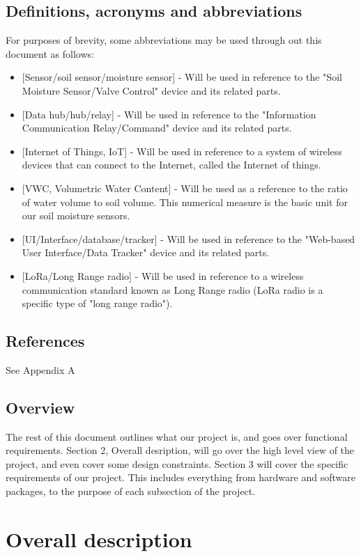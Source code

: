 \documentclass[onecolumn, draftclsnofoot,10pt, compsoc]{IEEEtran}
\begin{document}
	\subsection{Definitions, acronyms and abbreviations}
	For purposes of brevity, some abbreviations may be used through out this document as follows:
	\begin{itemize}
		\item{[Sensor/soil sensor/moisture sensor] - Will be used in reference to the "Soil Moisture Sensor/Valve Control" device and its related parts.}
		\item{[Data hub/hub/relay] - Will be used in reference to the "Information Communication Relay/Command" device and its related parts.}
        
        \item{[Internet of Things, IoT] - Will be used in reference to a system of wireless devices that can connect to the Internet, called the Internet of things.}
       	\item{[VWC, Volumetric Water Content] - Will be used as a reference to the ratio of water volume to soil volume. This numerical measure is the basic unit for our soil moisture sensors.}
		\item{[UI/Interface/database/tracker] - Will be used in reference to the "Web-based User Interface/Data Tracker" device and its related parts.}
        \item{[LoRa/Long Range radio] - Will be used in reference to a wireless communication standard known as Long Range radio (LoRa radio is a specific type of "long range radio").}
	\end{itemize}
	\subsection{References}
	See Appendix A
	\subsection{Overview}
    The rest of this document outlines what our project is, and goes over functional requirements.
    Section 2, Overall desription, will go over the high level view of the project, and even cover some design constraints. 
    Section 3 will cover the specific requirements of our project. 
    This includes everything from hardware and software packages, to the purpose of each subsection of the project. 
    
    
	\section{Overall description}
\end{document}
